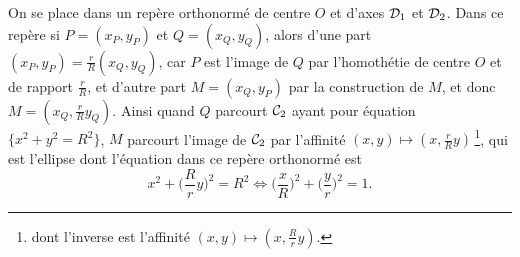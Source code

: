 \documentclass[a4paper,12pt,reqno]{amsart}
\begin{document}
\begin{solution}

  On se place dans un repère orthonormé de centre $O$ et d'axes $\mathcal{D}_{1}$ et $\mathcal{D}_{2}$. Dans ce repère si $P=(x_{P},y_{P})$ et $Q=(x_{Q},y_{Q})$, alors d'une part $(x_{P},y_{P})=\frac{r}{R}(x_{Q},y_{Q})$, car $P$ est l'image de $Q$ par l'homothétie de centre $O$ et de rapport $\frac{r}{R}$, et d'autre part $M=(x_{Q},y_{P})$ par la construction de $M$, et donc $M=(x_{Q},\frac{r}{R}y_{Q})$.\newline
  Ainsi quand $Q$ parcourt $\mathcal{C}_{2}$ ayant pour équation $\big\{ x^{2}+y^{2}=R^{2} \big\}$, $M$ parcourt l'image de $\mathcal{C}_{2}$ par l'affinité $(x,y)\mapsto(x,\frac{r}{R}y)$\,\footnote{dont l'inverse est l'affinité $(x,y)\mapsto(x,\frac{R}{r}y)$.}, qui est l'ellipse dont l'équation dans ce repère orthonormé est
  \[
    x^{2}+\Big(\frac{R}{r}y\Big)^{2}=R^{2}
    \iff
    \Big(\frac{x}{R}\Big)^{2}+\Big(\frac{y}{r}\Big)^{2}=1.
  \]
  \vspace{-2\baselineskip}

\end{solution}

\end{document}
